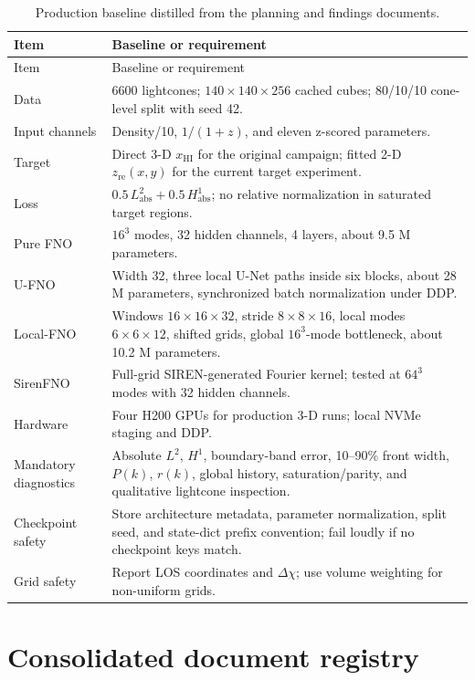 \documentclass[11pt,a4paper]{article}
\newcommand{\xhi}{x_{\mathrm{HI}}}
\newcommand{\zre}{z_{\mathrm{re}}}
\newcommand{\Ltwo}{L^2}
\newcommand{\Hone}{H^1}
\begin{document}
\begin{longtable}{@{}p{42mm}p{105mm}@{}}
\caption{Production baseline distilled from the planning and findings
documents.}\label{tab:baseline}\\
\toprule
Item & Baseline or requirement \\
\midrule
\endfirsthead
\toprule
Item & Baseline or requirement \\
\midrule
\endhead
Data & 6600 lightcones; \(140\times140\times256\) cached cubes; 80/10/10
cone-level split with seed 42. \\
Input channels & Density/10, \(1/(1+z)\), and eleven z-scored parameters. \\
Target & Direct 3-D \(\xhi\) for the original campaign; fitted 2-D
\(\zre(x,y)\) for the current target experiment. \\
Loss & \(0.5\,\Ltwo_{\mathrm{abs}}+0.5\,\Hone_{\mathrm{abs}}\); no relative
normalization in saturated target regions. \\
Pure FNO & \(16^3\) modes, 32 hidden channels, 4 layers, about 9.5 M
parameters. \\
U-FNO & Width 32, three local U-Net paths inside six blocks, about 28 M
parameters, synchronized batch normalization under DDP. \\
Local-FNO & Windows \(16\times16\times32\), stride \(8\times8\times16\),
local modes \(6\times6\times12\), shifted grids, global \(16^3\)-mode
bottleneck, about 10.2 M parameters. \\
SirenFNO & Full-grid SIREN-generated Fourier kernel; tested at \(64^3\)
modes with 32 hidden channels. \\
Hardware & Four H200 GPUs for production 3-D runs; local NVMe staging and
DDP. \\
Mandatory diagnostics & Absolute \(\Ltwo\), \(\Hone\), boundary-band error,
10--90\% front width, \(P(k)\), \(r(k)\), global history, saturation/parity,
and qualitative lightcone inspection. \\
Checkpoint safety & Store architecture metadata, parameter normalization,
split seed, and state-dict prefix convention; fail loudly if no checkpoint
keys match. \\
Grid safety & Report LOS coordinates and \(\Delta\chi\); use volume weighting
for non-uniform grids. \\
\bottomrule
\end{longtable}

\section{Consolidated document registry}
\end{document}
